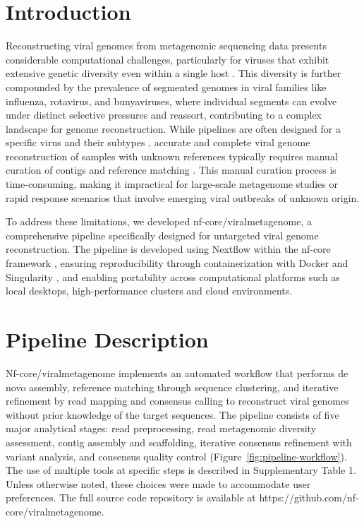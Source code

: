 
\section{Introduction}
Reconstructing viral genomes from metagenomic sequencing data presents considerable computational challenges, particularly for viruses that exhibit extensive genetic diversity even within a single host \cite{Baaijens2017-hw,Deng2021-nl,Meleshko2021-gb}. This diversity is further compounded by the prevalence of segmented genomes in viral families like influenza, rotavirus, and bunyaviruses, where individual segments can evolve under distinct selective pressures and reassort, contributing to a complex landscape for genome reconstruction. While pipelines are often designed for a specific virus and their subtypes \cite{Shepard2016-uh}, accurate and complete viral genome reconstruction of samples with unknown references typically requires manual curation of contigs and reference matching \cite{Tomkins-Tinch2017-qi,De_Vries2021-po,Li2025-uh}. This manual curation process is time-consuming, making it impractical for large-scale metagenome studies or rapid response scenarios that involve emerging viral outbreaks of unknown origin.

To address these limitations, we developed nf-core/viralmetagenome, a comprehensive pipeline specifically designed for untargeted viral genome reconstruction. The pipeline is developed using Nextflow \cite{Di-Tommaso2017-nz} within the nf-core framework \cite{Ewels2020-kk}, ensuring reproducibility through containerization with Docker \cite{Merkel2014-hn} and Singularity \cite{Kurtzer2017-iw}, and enabling portability across computational platforms such as local desktops, high-performance clusters and cloud environments.

\section{Pipeline Description}

Nf-core/viralmetagenome implements an automated workflow that performs de novo assembly, reference matching through sequence clustering, and iterative refinement by read mapping and consensus calling to reconstruct viral genomes without prior knowledge of the target sequences. The pipeline consists of five major analytical stages: read preprocessing, read metagenomic diversity assessment, contig assembly and scaffolding, iterative consensus refinement with variant analysis, and consensus quality control (Figure~\ref{fig:pipeline-workflow}). The use of multiple tools at specific steps is described in Supplementary Table 1. Unless otherwise noted, these choices were made to accommodate user preferences. The full source code repository is available at https://github.com/nf-core/viralmetagenome.

